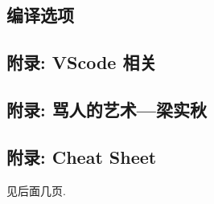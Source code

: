 \documentclass[a4paper, twoside]{article}
\begin{document}
\begin{multicols}{2}
			\subsection{编译选项}
				
				



			
			\subsection{附录: VScode 相关}
				
			
			\newpage
			\subsection{附录: 骂人的艺术—梁实秋}
				

	\end{multicols}
	
	\vspace{1.5cm}
	\subsection{附录: Cheat Sheet}
		见后面几页.

	

	

	

	\pagestyle{empty}


	\newpage

	\null


\end{document}
